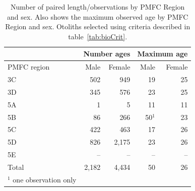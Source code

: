 \begin{table}[b]
\centering
\caption{\label{tab:numagesByArea} Number of paired length/observations by PMFC Region and sex. Also shows the maximum observed age by PMFC Region and sex.  Otoliths selected using criteria described in table~\ref{tab:bioCrit}.}
\begin{tabular}{lrrrr}
\hline
            & \multicolumn{2}{c}{Number ages} & \multicolumn{2}{c}{Maximum age} \\
\hline
PMFC region &  Male & Female &   Male & Female \\
\hline
3C          &   502 &    949 &     19 &     25 \\
3D          &   345 &    576 &     23 &     25 \\
5A          &     1 &      5 &     11 &     11 \\
5B          &    86 &    266 & 50$^1$ &     23 \\
5C          &   422 &    463 &     17 &     26 \\
5D          &   826 &  2,175 &     23 &     26 \\
5E          &    -- &     -- &     -- &     -- \\
Total       & 2,182 &  4,434 &     50 &     26 \\
$^1$ one observation only \\
\hline
\end{tabular}
\end{table}

